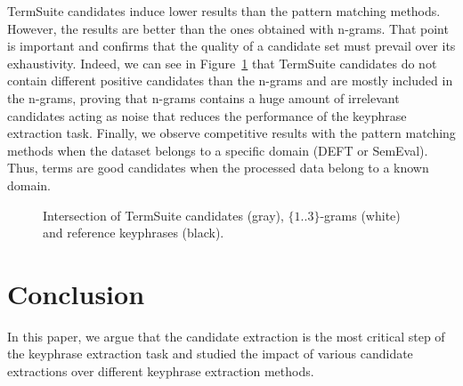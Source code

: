       TermSuite candidates induce lower results than the pattern matching
      methods. However, the results are better than the ones obtained with
      n-grams. That point is important and confirms that the quality of a
      candidate set must prevail over its exhaustivity. Indeed, we can see in
      Figure~\ref{fig:quality_prevails_over_exhaustivity} that TermSuite
      candidates do not contain different positive candidates than the n-grams
      and are mostly included in the n-grams, proving that n-grams contains a
      huge amount of irrelevant candidates acting as noise that reduces the
      performance of the keyphrase extraction task. Finally, we observe
      competitive results with the pattern matching methods when the dataset
      belongs to a specific domain (DEFT or SemEval). Thus, terms are good
      candidates when the processed data belong to a known domain.
      \begin{figure}[t]
        \begin{center}
        \caption{Intersection of TermSuite candidates (gray), $\{1..3\}$-grams
                 (white) and reference keyphrases (black).
                 \label{fig:quality_prevails_over_exhaustivity}}
        \end{center}
      \end{figure}

\section{Conclusion}
\label{sec:conclusion}
  In this paper, we argue that the candidate extraction is the most critical
  step of the keyphrase extraction task and studied the impact of various
  candidate extractions over different keyphrase extraction methods.

